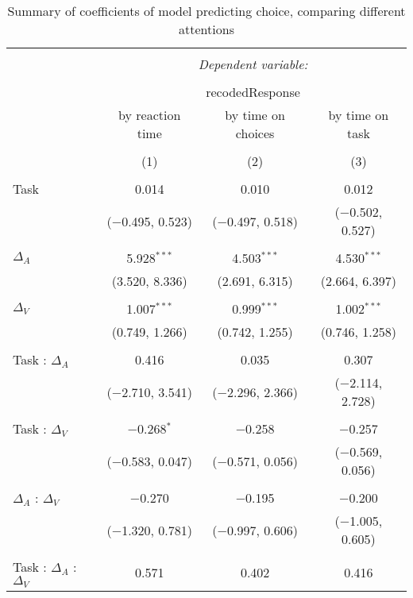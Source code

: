 
\begin{table}[h] \centering 
  \caption{Summary of coefficients of model predicting choice, comparing different attentions} 
  \label{table:choiceModelAttention} 
\begin{tabular}{@{\extracolsep{5pt}}lccc} 
\\[-1.8ex]\hline 
\hline \\[-1.8ex] 
 & \multicolumn{3}{c}{\textit{Dependent variable:}} \\ 
\cline{2-4} 
\\[-1.8ex] & \multicolumn{3}{c}{recodedResponse} \\ 
 & by reaction time & by time on choices & by time on task \\ 
\\[-1.8ex] & (1) & (2) & (3)\\ 
\hline \\[-1.8ex] 
 Task & 0.014 & 0.010 & 0.012 \\ 
  & ($-$0.495, 0.523) & ($-$0.497, 0.518) & ($-$0.502, 0.527) \\ 
  & & & \\ 
 $\Delta_A$ & 5.928$^{***}$ & 4.503$^{***}$ & 4.530$^{***}$ \\ 
  & (3.520, 8.336) & (2.691, 6.315) & (2.664, 6.397) \\ 
  & & & \\ 
 $\Delta_V$ & 1.007$^{***}$ & 0.999$^{***}$ & 1.002$^{***}$ \\ 
  & (0.749, 1.266) & (0.742, 1.255) & (0.746, 1.258) \\ 
  & & & \\ 
 Task : $\Delta_A$ & 0.416 & 0.035 & 0.307 \\ 
  & ($-$2.710, 3.541) & ($-$2.296, 2.366) & ($-$2.114, 2.728) \\ 
  & & & \\ 
 Task : $\Delta_V$ & $-$0.268$^{*}$ & $-$0.258 & $-$0.257 \\ 
  & ($-$0.583, 0.047) & ($-$0.571, 0.056) & ($-$0.569, 0.056) \\ 
  & & & \\ 
 $\Delta_A$ : $\Delta_V$ & $-$0.270 & $-$0.195 & $-$0.200 \\ 
  & ($-$1.320, 0.781) & ($-$0.997, 0.606) & ($-$1.005, 0.605) \\ 
  & & & \\ 
 Task : $\Delta_A$ :  $\Delta_V$ & 0.571 & 0.402 & 0.416 \\ 

\end{tabular}
\end{table}
